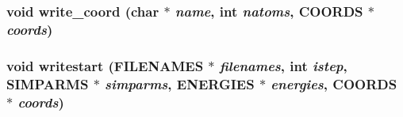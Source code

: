 \subsubsection{\setlength{\rightskip}{0pt plus 5cm}void write\_\-coord (char $\ast$ {\em name}, int {\em natoms}, {\bf COORDS} $\ast$ {\em coords})}\label{md__writestart_8c_d455a9b7eb5bf2015780dfffbe8a9405}


\subsubsection{\setlength{\rightskip}{0pt plus 5cm}void writestart ({\bf FILENAMES} $\ast$ {\em filenames}, int {\em istep}, {\bf SIMPARMS} $\ast$ {\em simparms}, {\bf ENERGIES} $\ast$ {\em energies}, {\bf COORDS} $\ast$ {\em coords})}\label{md__writestart_8c_64e1396071498428219a6b350471ef60}


